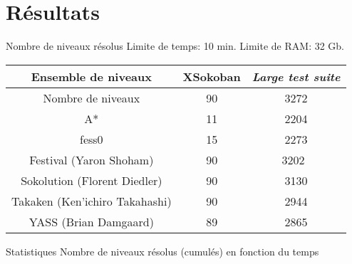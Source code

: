     \section{Résultats}
        \begin{frame}{Nombre de niveaux résolus}
            Limite de temps: 10 min. Limite de RAM: 32 Gb.
            \centering
            \begin{tabular}{|c|c|c|}
                \hline
                Ensemble de niveaux            & XSokoban & \textit{Large test suite} \\
                \hline
                Nombre de niveaux              & 90       & 3272 \\
                \hline
                A*                             & 11       & 2204 \\
                \hline
                fess0                          & 15       & 2273 \\
                \hline
                Festival (Yaron Shoham)        & 90       & 3202 \\
                \hline
                Sokolution (Florent Diedler)   & 90       & 3130 \\
                \hline
                Takaken (Ken'ichiro Takahashi) & 90       & 2944 \\
                \hline
                YASS (Brian Damgaard)          & 89       & 2865 \\
                \hline
            \end{tabular}
        \end{frame}

        \begin{frame}{Statistiques}
            \centering
            Nombre de niveaux résolus (cumulés) en fonction du temps

            \vspace{0.4cm}
            
        \end{frame}

